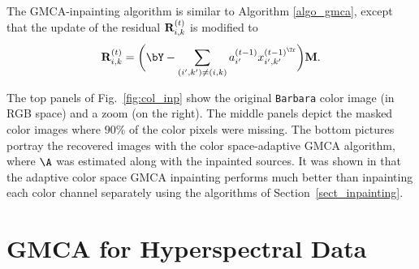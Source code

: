 The GMCA-inpainting algorithm is similar to Algorithm \ref{algo_gmca}, except that the update of the residual ${\bf R}^{(t)}_{i,k}$ is modified to
\[
{\bf R}_{i,k}^{(t)} = \bigg({\bY}- \sum_{(i',k') \neq (i,k)} {a}_{i'}^{{(t-1)}}{x}_{i',k'}^{{(t-1)}^\Tr}\bigg){ \bf M}.
\]



The top panels of Fig.\ \ref{fig:col_inp} show the original \texttt{Barbara} color image (in RGB space) and a zoom (on the right). The middle panels depict the masked color images where $90$\% of the color pixels were missing. The bottom pictures portray the recovered images with the color space-adaptive GMCA algorithm, where $\A$ was estimated along with the inpainted sources. It was shown in \citet{BobinJMIV} that the adaptive color space GMCA inpainting performs much better than inpainting each color channel separately using the algorithms of Section~\ref{sect_inpainting}.



\section{GMCA for Hyperspectral Data}


\label{sec:hypGMCA}
